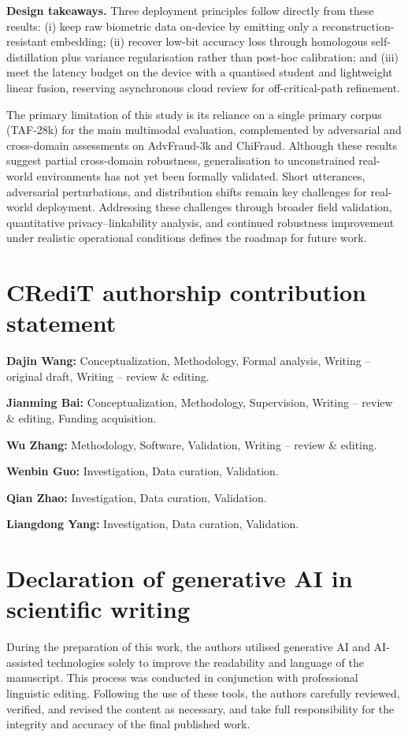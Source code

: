 \documentclass[a4paper,fleqn]{cas-sc}
\begin{document}
\textbf{Design takeaways.} Three deployment principles follow directly from these results: (i) keep raw biometric data on-device by emitting only a reconstruction-resistant embedding; (ii) recover low-bit accuracy loss through homologous self-distillation plus variance regularisation rather than post-hoc calibration; and (iii) meet the latency budget on the device with a quantised student and lightweight linear fusion, reserving asynchronous cloud review for off-critical-path refinement.

The primary limitation of this study is its reliance on a single primary corpus (TAF-28k) for the main multimodal evaluation, complemented by adversarial and cross-domain assessments on AdvFraud-3k and ChiFraud. Although these results suggest partial cross-domain robustness, generalisation to unconstrained real-world environments has not yet been formally validated. Short utterances, adversarial perturbations, and distribution shifts remain key challenges for real-world deployment. Addressing these challenges through broader field validation, quantitative privacy--linkability analysis, and continued robustness improvement under realistic operational conditions defines the roadmap for future work.

\section*{CRediT authorship contribution statement}

\textbf{Dajin Wang:} Conceptualization, Methodology, Formal analysis, Writing -- original draft, Writing -- review \& editing.

\textbf{Jianming Bai:} Conceptualization, Methodology, Supervision, Writing -- review \& editing, Funding acquisition.

\textbf{Wu Zhang:} Methodology, Software, Validation, Writing -- review \& editing.

\textbf{Wenbin Guo:} Investigation, Data curation, Validation.

\textbf{Qian Zhao:} Investigation, Data curation, Validation.

\textbf{Liangdong Yang:} Investigation, Data curation, Validation.

\section*{Declaration of generative AI in scientific writing}

During the preparation of this work, the authors utilised generative AI and AI-assisted technologies solely to improve the readability and language of the manuscript. This process was conducted in conjunction with professional linguistic editing. Following the use of these tools, the authors carefully reviewed, verified, and revised the content as necessary, and take full responsibility for the integrity and accuracy of the final published work.
\end{document}
